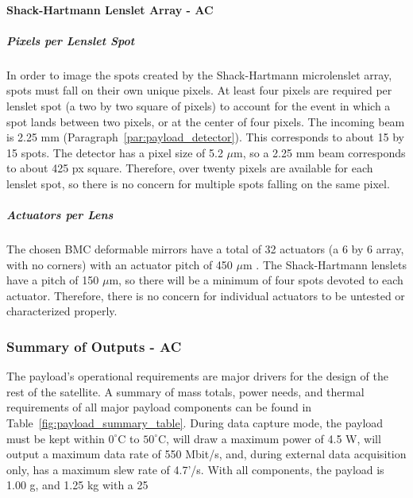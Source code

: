 \documentclass[12pt]{article}
\begin{document}
\paragraph{Shack-Hartmann Lenslet Array - AC}
				
				\subparagraph{Pixels per Lenslet Spot}\label{sec:payload_pixels}
In order to image the spots created by the Shack-Hartmann microlenslet array, spots must fall on their own unique pixels.  At least four pixels are required per lenslet spot (a two by two square of pixels) to account for the event in which a spot lands between two pixels, or at the center of four pixels.
The incoming beam is 2.25 mm (Paragraph~\ref{par:payload_detector}).  This corresponds to about 15 by 15 spots. The detector has a pixel size of 5.2 $\mu$m, so a 2.25 mm beam corresponds to about 425 px square.  Therefore, over twenty pixels are available for each lenslet spot, so there is no concern for multiple spots falling on the same pixel. 
				
				\subparagraph{Actuators per Lens}
The chosen BMC deformable mirrors have a total of 32 actuators (a 6 by 6 array, with no corners) with an actuator pitch of 450 $\mu$m \cite{BMC}.  The Shack-Hartmann lenslets have a pitch of 150 $\mu$m, so there will be a minimum of four spots devoted to each actuator.  Therefore, there is no concern for individual actuators to be untested or characterized properly.

			\subsubsection{Summary of Outputs - AC}

The payload's operational requirements are major drivers for the design of the rest of the satellite. A summary of mass totals, power needs, and thermal requirements of all major payload components can be found in Table~\ref{fig:payload_summary_table}.  
During data capture mode, the payload must be kept within $0^\circ$C to $50^\circ$C, will draw a maximum power of 4.5 W, will output a maximum data rate of 550 Mbit/s, and, during external data acquisition only, has a maximum slew rate of 4.7'/s. 
With all components, the payload is 1.00 g, and 1.25 kg with a 25%
\end{document}
